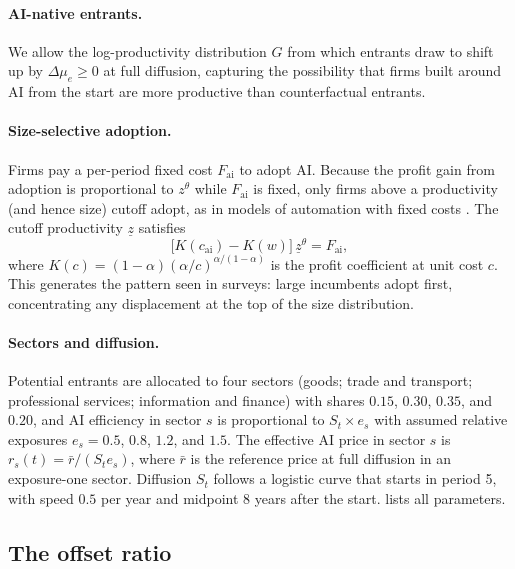 \paragraph{AI-native entrants.}
We allow the log-productivity distribution $G$ from which entrants draw to shift up by $\Delta\mu_e \ge 0$ at full diffusion, capturing the possibility that firms built around AI from the start are more productive than counterfactual entrants.

\paragraph{Size-selective adoption.}
Firms pay a per-period fixed cost $F_{\text{ai}}$ to adopt AI.
Because the profit gain from adoption is proportional to $z^\theta$ while $F_{\text{ai}}$ is fixed, only firms above a productivity (and hence size) cutoff adopt, as in models of automation with fixed costs \citep{hubmer2021typical}.
The cutoff productivity $\underline{z}$ satisfies
\begin{equation}\label{eq:adoption-cutoff}
  \bigl[K(c_{\text{ai}}) - K(w)\bigr]\, \underline{z}^{\theta} = F_{\text{ai}},
\end{equation}
where $K(c) = (1-\alpha)(\alpha/c)^{\alpha/(1-\alpha)}$ is the profit coefficient at unit cost $c$.
This generates the pattern seen in surveys: large incumbents adopt first, concentrating any displacement at the top of the size distribution.

\paragraph{Sectors and diffusion.}
Potential entrants are allocated to four sectors (goods; trade and transport; professional services; information and finance) with shares $0.15$, $0.30$, $0.35$, and $0.20$, and AI efficiency in sector $s$ is proportional to $S_t \times e_s$ with assumed relative exposures $e_s = 0.5$, $0.8$, $1.2$, and $1.5$.
The effective AI price in sector $s$ is $r_s(t) = \bar r / (S_t e_s)$, where $\bar r$ is the reference price at full diffusion in an exposure-one sector.
Diffusion $S_t$ follows a logistic curve that starts in period 5, with speed $0.5$ per year and midpoint 8 years after the start.
 lists all parameters.

\subsection{The offset ratio}\label{sec:ai-offset}

